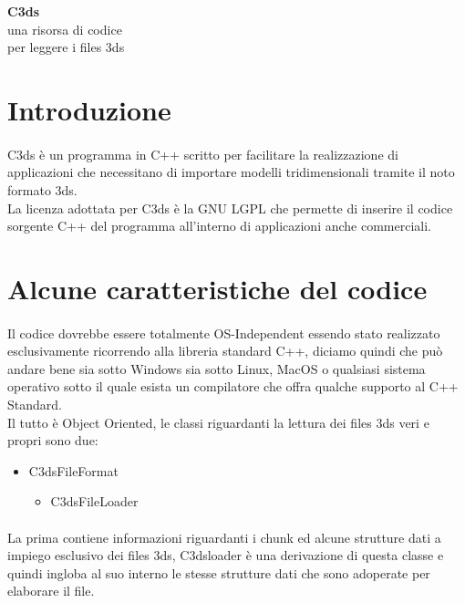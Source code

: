 \documentclass[11pt,a4paper]{article}
\author{Andrea Ingegneri}
\begin{document}
\begin{center}
\fontsize{25}{25}
\selectfont
\textbf{C3ds\\}
\fontsize{18}{18}
\selectfont
una risorsa di codice\\ per leggere i files 3ds
\end{center}
\section*{Introduzione}

\paragraph*{}
C3ds \`e un programma in C++ scritto per facilitare la realizzazione di applicazioni che necessitano di importare modelli tridimensionali tramite il noto formato 3ds.\\
La licenza adottata per C3ds \`e la GNU LGPL che permette di inserire il codice sorgente C++ del programma all'interno di applicazioni anche commerciali.

\section*{Alcune caratteristiche del codice}
\paragraph*{}
Il codice dovrebbe essere totalmente OS-Independent essendo stato realizzato esclusivamente ricorrendo alla libreria standard C++, diciamo quindi che pu\`o andare bene sia sotto Windows sia sotto Linux, MacOS o qualsiasi sistema operativo sotto il quale esista un compilatore che offra qualche supporto al C++ Standard.\\
Il tutto \`e Object Oriented, le classi riguardanti la lettura dei files 3ds veri e propri sono due:
\begin{itemize}
\item C3dsFileFormat
\begin{itemize}
\item C3dsFileLoader
\end{itemize} 
\end{itemize}

\paragraph*{}
La prima contiene informazioni riguardanti i chunk ed alcune strutture dati a impiego esclusivo dei files 3ds, C3dsloader \`e una derivazione di questa classe e quindi ingloba al suo interno le stesse strutture dati che sono adoperate per elaborare il file.
\end{document}
